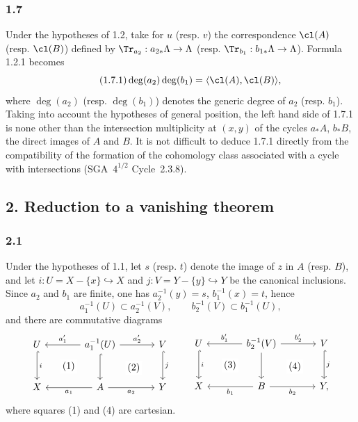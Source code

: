\subsubsection*{1.7}
Under the hypotheses of 1.2, take for $u$ (resp. $v$) the correspondence $\cl(A)$ (resp. $\cl(B)$) defined by $\Tr_{a_2}:a_{2*}\Lambda\to\Lambda$ (resp. $\Tr_{b_1}:b_{1*}\Lambda\to\Lambda$). Formula 1.2.1 becomes
\begin{equation}\tag{1.7.1}
\deg(a_2)\deg(b_1)=\langle \cl(A),\cl(B)\rangle,
\end{equation}
where $\deg(a_2)$ (resp. $\deg(b_1)$) denotes the generic degree of $a_2$ (resp. $b_1$). Taking into account the hypotheses of general position, the left hand side of 1.7.1 is none other than the intersection multiplicity at $(x,y)$ of the cycles $a_*A$, $b_*B$, the direct images of $A$ and $B$. It is not difficult to deduce 1.7.1 directly from the compatibility of the formation of the cohomology class associated with a cycle with intersections (SGA~$4^{1/2}$ Cycle~2.3.8).


\subsection*{2. Reduction to a vanishing theorem}

\subsubsection*{2.1}
Under the hypotheses of 1.1, let $s$ (resp. $t$) denote the image of $z$ in $A$ (resp. $B$), and let $i:U=X-\{x\}\hookrightarrow X$ and $j:V=Y-\{y\}\hookrightarrow Y$ be the canonical inclusions. Since $a_2$ and $b_1$ are finite, one has $a_2^{-1}(y)=s$, $b_1^{-1}(x)=t$, hence
\[
a_1^{-1}(U)\subset a_2^{-1}(V),\qquad b_2^{-1}(V)\subset b_1^{-1}(U),
\]
and there are commutative diagrams
\[
\begin{tikzcd}[column sep=large,row sep=large]
U \arrow[d,hook,"i"] \arrow[rd,phantom,"(1)"{description}] & a_1^{-1}(U) \arrow[l,"a'_1"'] \arrow[r,"a'_2"] \arrow[d,hook] \arrow[rd,phantom,"(2)"{description}] & V \arrow[d,hook,"j"]\\
X & A \arrow[l,"a_1"] \arrow[r,"a_2"'] & Y
\end{tikzcd}
\qquad
\begin{tikzcd}[column sep=large,row sep=large]
U \arrow[d,hook,"i"] \arrow[rd,phantom,"(3)"{description}] & b_2^{-1}(V) \arrow[l,"b'_1"'] \arrow[r,"b'_2"] \arrow[d] \arrow[rd,phantom,"(4)"{description}] & V \arrow[d,hook,"j"]\\
X & B \arrow[l,"b_1"] \arrow[r,"b_2"'] & Y ,
\end{tikzcd}
\]
where squares (1) and (4) are cartesian.


